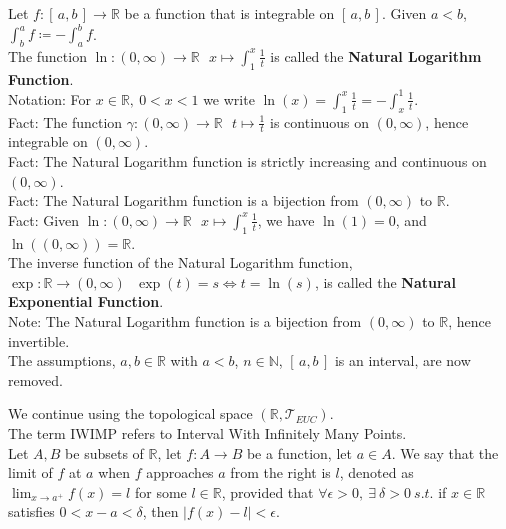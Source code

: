 \documentclass[11pt]{article}
\newcommand{\R}{\mathbb{R}}
\newcommand{\N}{\mathbb{N}}
\newcommand{\T}{\mathcal{T}}
\newcommand{\note}{\color{gray}Note: \color{black}}
\newcommand{\notation}{\color{gray}Notation: \color{black}}
\newcommand{\fact}{\color{gray}Fact: \color{black}}
\begin{document}
		\noindent Let $f:[\,a,b\,]\to \R$ be a function that is integrable on $[\,a,b\,]$. Given $a<b$, $\int_b^a f \coloneqq -\int_a^b f$.\\
		
		\noindent The function $\ln:(0,\infty) \to \R \ \ \ x \mapsto \int_1^x \frac{1}{t}$ is called the \textbf{Natural Logarithm Function}.\\
		\notation For $x \in \R, \ 0<x<1$ we write $\ln(x)=\int_1^x \frac{1}{t} = -\int_x^1 \frac{1}{t}$. \\
		\fact The function $\gamma:(0,\infty) \to \R \ \ \ t \mapsto \frac{1}{t}$ is continuous on $(0,\infty)$, hence integrable on $(0,\infty)$.\\
		\fact The Natural Logarithm function is strictly increasing and continuous on $(0,\infty)$.\\
		\fact The Natural Logarithm function is a bijection from $(0,\infty)$ to $\R$.\\
		\fact Given $\ln:(0,\infty) \to \R \ \ \ x \mapsto \int_1^x \frac{1}{t}$, we have $\ln(1)=0$, and $\ln((0,\infty))=\R$.\\
		
		\noindent The inverse function of the Natural Logarithm function, \mbox{$\exp:\R \to (0,\infty) \ \ \ \exp(t)=s \iff t=\ln(s)$,} is called the \textbf{Natural Exponential Function}.\\
		\note The Natural Logarithm function is a bijection from $(0,\infty)$ to $\R$, hence invertible.\\
		
		\noindent \color{red} The assumptions, $a,b \in \R$ with $a<b$, $n \in \N$, $[\,a,b\,]$ is an interval, are now removed.\color{black}\\
		
	\clearpage
	
		\noindent \color{red} We continue using the topological space $(\R, \T_{EUC})$.\\
		The term IWIMP refers to Interval With Infinitely Many Points.\color{black} \\
		
		\noindent Let $A,B$ be subsets of $\R$, let $f:A \to B$ be a function, let $a \in A$. We say that the limit of $f$ at $a$ when $f$ approaches $a$ from the right is $l$, denoted as $\lim_{x \to a^+} f(x) =l $ for some $l \in \R$, provided that $\forall \epsilon >0, \ \exists \ \delta >0 \ s.t.$ if $x \in \R$ satisfies $0<x-a<\delta$, then $|f(x) - l |<\epsilon$.\\
		
\end{document}
